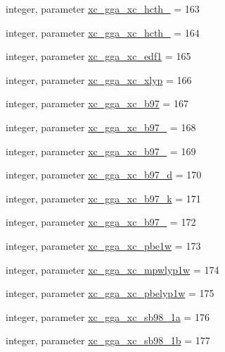 \begin{DoxyCompactItemize}
integer, parameter \hyperlink{classlibxc__funcs__m_ac27ea28fe276640b4e6eaf6bf35893b4}{xc\-\_\-gga\-\_\-xc\-\_\-hcth\-\_} = 163
\item 
integer, parameter \hyperlink{classlibxc__funcs__m_a1974744f9983a7247d32b3788f974822}{xc\-\_\-gga\-\_\-xc\-\_\-hcth\-\_} = 164
\item 
integer, parameter \hyperlink{classlibxc__funcs__m_aedd9913cc669f93ecaeafee0cb9d8042}{xc\-\_\-gga\-\_\-xc\-\_\-edf1} = 165
\item 
integer, parameter \hyperlink{classlibxc__funcs__m_a03e9eb4cc28a13a2d4903c811a4ebd84}{xc\-\_\-gga\-\_\-xc\-\_\-xlyp} = 166
\item 
integer, parameter \hyperlink{classlibxc__funcs__m_a588c6f17bfd2e2bb1f561ef7727670df}{xc\-\_\-gga\-\_\-xc\-\_\-b97} = 167
\item 
integer, parameter \hyperlink{classlibxc__funcs__m_a458b1b9bb51ca33f4c2c1be9498fddc4}{xc\-\_\-gga\-\_\-xc\-\_\-b97\-\_} = 168
\item 
integer, parameter \hyperlink{classlibxc__funcs__m_a85586fe4e99394ae8949c328fda4c699}{xc\-\_\-gga\-\_\-xc\-\_\-b97\-\_} = 169
\item 
integer, parameter \hyperlink{classlibxc__funcs__m_a7c432d893c41df9829cd1aef99120c7f}{xc\-\_\-gga\-\_\-xc\-\_\-b97\-\_\-d} = 170
\item 
integer, parameter \hyperlink{classlibxc__funcs__m_a814fc12334d925edd13cab81e3eb851a}{xc\-\_\-gga\-\_\-xc\-\_\-b97\-\_\-k} = 171
\item 
integer, parameter \hyperlink{classlibxc__funcs__m_a94830c0f4373270fc84e48b94a4e4169}{xc\-\_\-gga\-\_\-xc\-\_\-b97\-\_} = 172
\item 
integer, parameter \hyperlink{classlibxc__funcs__m_aae929c8f8786199690271d22e625e7df}{xc\-\_\-gga\-\_\-xc\-\_\-pbe1w} = 173
\item 
integer, parameter \hyperlink{classlibxc__funcs__m_a8b0834f3b5fe226afe4e2c9990d6fd74}{xc\-\_\-gga\-\_\-xc\-\_\-mpwlyp1w} = 174
\item 
integer, parameter \hyperlink{classlibxc__funcs__m_a72b8b491aee2ac2ec1357ec005ebf20b}{xc\-\_\-gga\-\_\-xc\-\_\-pbelyp1w} = 175
\item 
integer, parameter \hyperlink{classlibxc__funcs__m_aafe8927b9bdf87312eab8f3140a5fb15}{xc\-\_\-gga\-\_\-xc\-\_\-sb98\-\_\-1a} = 176
\item 
integer, parameter \hyperlink{classlibxc__funcs__m_a4b22daa69127be305170871894edbe05}{xc\-\_\-gga\-\_\-xc\-\_\-sb98\-\_\-1b} = 177
\item 

\end{DoxyCompactItemize}
